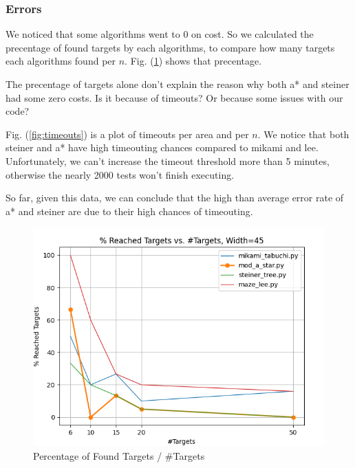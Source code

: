 \subsubsection{Errors}
We noticed that some algorithms went to 0 on cost. So we calculated the precentage of found targets by each algorithms, to compare how many targets each algorithms found per $n$. Fig. (\ref{fig:percTargets}) shows that precentage.

The precentage of targets alone don't explain the reason why both a* and steiner had some zero costs.  Is it because of timeouts? Or because some issues with our code?

Fig. (\ref{fig:timeouts}) is a plot of timeouts per area and per $n$. We notice that both steiner and a* have high timeouting chances compared to mikami and lee. Unfortunately, we can't increase the timeout threshold more than 5 minutes, otherwise the nearly 2000 tests won't finish executing.

So far, given this data, we can conclude that the high than average error rate of a* and steiner are due to their high chances of timeouting.

\begin{figure}
\centering
\includegraphics[width=\linewidth]{figures/plots/percTargets_areaConst.png}
\caption{Percentage of Found Targets / \#Targets}
\label{fig:percTargets}
\end{figure}

